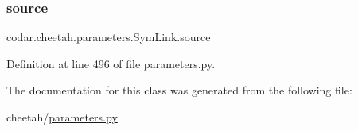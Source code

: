 \subsubsection{\texorpdfstring{source}{source}}
{\footnotesize\ttfamily codar.\+cheetah.\+parameters.\+Sym\+Link.\+source}



Definition at line 496 of file parameters.\+py.



The documentation for this class was generated from the following file\+:\begin{DoxyCompactItemize}
\item 
cheetah/\hyperlink{parameters_8py}{parameters.\+py}\end{DoxyCompactItemize}
